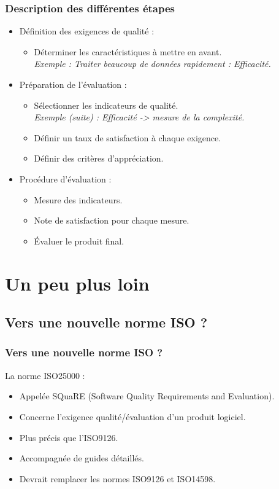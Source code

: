 \documentclass[10pt]{beamer}
\begin{document}
\begin{frame}
\frametitle{Description des différentes étapes}
   \begin{itemize}
	\item<2-> Définition des exigences de qualité :
		   \begin{itemize}
			\item<3->Déterminer les caractéristiques à mettre en avant. \\
			\pause[4]\textit{Exemple : Traiter beaucoup de données rapidement : Efficacité.}
    		   \end{itemize}
\medskip
	\item<5-> Préparation de l'évaluation :
		   \begin{itemize}
			\item<6->Sélectionner les indicateurs de qualité. \\
			\pause[7]\textit{Exemple (suite) : Efficacité -> mesure de la complexité.}
\smallskip
			\item<8->Définir un taux de satisfaction à chaque exigence.
\smallskip
			\item<9->Définir des critères d'appréciation.
    		   \end{itemize}
\medskip
	\item<10-> Procédure d'évaluation :
		   \begin{itemize}
			\item<11->Mesure des indicateurs.
\smallskip
			\item<12->Note de satisfaction pour chaque mesure.
\smallskip
			\item<13->\'Evaluer le produit final.
    		   \end{itemize}
    \end{itemize}
\end{frame}



\section{Un peu plus loin}

%
\subsection{Vers une nouvelle norme ISO ?}
\begin{frame}
\frametitle{Vers une nouvelle norme ISO ?}
\pause[2] La norme ISO25000 :
\medskip
   \begin{itemize}
	\item<3-> Appelée SQuaRE (Software Quality Requirements and Evaluation).
\medskip
	\item<4-> Concerne l'exigence qualité/évaluation d'un produit logiciel.
\medskip
	\item<5-> Plus précis que l'ISO9126.
\medskip
	\item<6-> Accompagnée de guides détaillés.
\medskip
	\item<7-> Devrait remplacer les normes ISO9126 et ISO14598.
    \end{itemize}
\end{frame}
\end{document}
